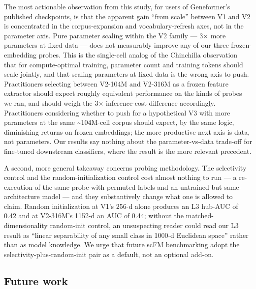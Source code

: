 \documentclass[10pt]{article}
\begin{document}
The most actionable observation from this study, for users of
Geneformer's published checkpoints, is that the apparent gain ``from
scale'' between V1 and V2 is concentrated in the corpus-expansion and
vocabulary-refresh axes, not in the parameter axis. Pure parameter
scaling within the V2 family --- 3$\times$ more parameters at fixed data ---
does not measurably improve any of our three frozen-embedding probes.
This is the single-cell analog of the Chinchilla observation \citep{hoffmann2022chinchilla} that for compute-optimal training, parameter count and
training tokens should scale jointly, and that scaling parameters at
fixed data is the wrong axis to push. Practitioners selecting between
V2-104M and V2-316M as a frozen feature extractor should expect roughly
equivalent performance on the kinds of probes we ran, and should weigh
the 3$\times$ inference-cost difference accordingly. Practitioners considering
whether to push for a hypothetical V3 with more parameters at the same
\textasciitilde104M-cell corpus should expect, by the same logic,
diminishing returns on frozen embeddings; the more productive next axis
is data, not parameters. Our results say nothing about the
parameter-vs-data trade-off for fine-tuned downstream classifiers, where
the \citet{venkatesh2026} result is the more relevant precedent.

A second, more general takeaway concerns probing methodology. The
selectivity control \citep{hewitt2019} and the random-initialization
control \citep{zhang2018random} cost almost nothing to run --- a
re-execution of the same probe with permuted labels and an
untrained-but-same-architecture model --- and they substantively change
what one is allowed to claim. Random initialization at V1's 256-d alone
produces an L3 hub-AUC of 0.42 and at V2-316M's 1152-d an AUC of 0.44;
without the matched-dimensionality random-init control, an unsuspecting
reader could read our L3 result as ``linear separability of any small
class in 1000-d Euclidean space'' rather than as model knowledge. We
urge that future scFM benchmarking adopt the
selectivity-plus-random-init pair as a default, not an optional add-on.

\subsection{Future work}\label{future-work}
\end{document}
